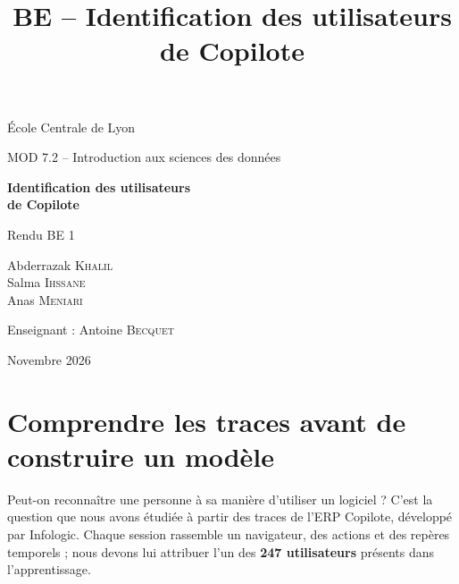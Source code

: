 \documentclass{rapportECL}
\title{BE -- Identification des utilisateurs de Copilote}
\begin{document}

\ifclasseECL
  \fairemarges
  \fairepagedegarde
\else
  \begin{titlepage}
    \centering
    {\large École Centrale de Lyon\par}
    \vspace{1.5cm}
    {\large MOD 7.2 -- Introduction aux sciences des données\par}
    \vfill
    {\LARGE\bfseries Identification des utilisateurs\\[0.3em]de Copilote\par}
    \vspace{0.8cm}
    {\large Rendu BE 1\par}
    \vfill
    Abderrazak \textsc{Khalil}\\
    Salma \textsc{Ihssane}\\
    Anas \textsc{Meniari}\par
    \vspace{1cm}
    Enseignant : Antoine \textsc{Becquet}\par
    \vspace{1cm}
    Novembre 2026
  \end{titlepage}
\fi

\clearpage
\thispagestyle{empty}
\begingroup
  \small
  \setlength{\parskip}{0pt}
  \setcounter{tocdepth}{2}
  \tableofcontents
\endgroup
\clearpage
{}

\section{Comprendre les traces avant de construire un modèle}

Peut-on reconnaître une personne à sa manière d'utiliser un logiciel ? C'est la question que nous avons étudiée à partir des traces de l'ERP Copilote, développé par Infologic. Chaque session rassemble un navigateur, des actions et des repères temporels ; nous devons lui attribuer l'un des \textbf{247 utilisateurs} présents dans l'apprentissage.
\end{document}
